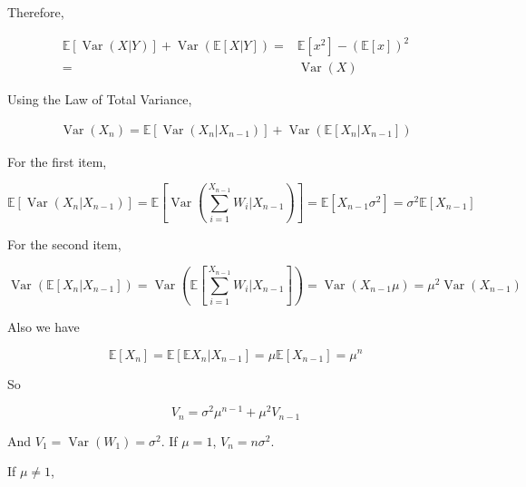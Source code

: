\documentclass{article}
\begin{document}
Therefore,

\begin{equation}
\begin{aligned}
  \mathbb{E}[\operatorname{Var} (X|Y)] + \operatorname{Var}(\mathbb{E}[X|Y])  = &\mathbb{E}[x^2] - (\mathbb{E}[x])^2 \\ =&\operatorname{Var}(X)
\end{aligned}
\end{equation}


Using the Law of Total Variance, 

\begin{equation}
    \begin{aligned}
        \operatorname{Var}(X_n) = \mathbb{E}[\operatorname{Var} (X_{n}|X_{n-1})] + \operatorname{Var}(\mathbb{E}[X_n|X_{n-1}])
    \end{aligned}
\end{equation}

For the first item,

\begin{equation}
    \mathbb{E}\left[\operatorname{Var} \left(X_{n}|X_{n-1}\right)\right] = \mathbb{E}\left[\operatorname{Var} \left(\sum_{i=1}^{X_{n-1}} W_i|X_{n-1}\right)\right] = \mathbb{E} \left[X_{n-1} \sigma^2\right] = \sigma^2 \mathbb{E}[X_{n-1}]
\end{equation}

For the second item,

\begin{equation}
    \operatorname{Var}\left(\mathbb{E}\left[X_n|X_{n-1}\right]\right) = \operatorname{Var}\left(\mathbb{E}\left[\sum_{i=1}^{X_{n-1}} W_i|X_{n-1}\right]\right) =  \operatorname{Var}\left({X_{n-1}} \mu \right) = \mu^2 \operatorname{Var}(X_{n-1})
\end{equation}

Also we have 

\begin{equation}
    \mathbb{E}[X_n] = \mathbb{E} [\mathbb{E}X_n | X_{n-1}] = \mu \mathbb{E}[X_{n-1}] = \mu^n
\end{equation}


So 

\begin{equation}
    V_n  = \sigma^2 \mu^{n-1} + \mu^2 V_{n-1}
\end{equation}

And $V_1 = \operatorname{Var}(W_1) = \sigma^2$. If $\mu = 1$, $V_n = n\sigma^2$.

If $\mu \neq 1$,  
\end{document}

